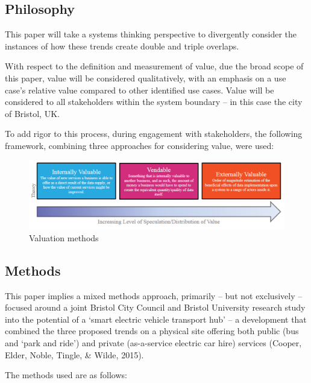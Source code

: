 \documentclass[journal]{IEEEtran}
\begin{document}
\subsection{Philosophy}

This paper will take a systems thinking perspective to divergently
consider the instances of how these trends create double and triple
overlaps.

With respect to the definition and measurement of value, due the broad
scope of this paper, value will be considered qualitatively, with an
emphasis on a use case's relative value compared to other identified
use cases. Value will be considered to all stakeholders within the
system boundary – in this case the city of Bristol, UK.
 
To add rigor to this process, during engagement with stakeholders, the
following framework, combining three approaches for considering value,
were used:

\begin{figure}[!h]
\centering
\includegraphics[width=\columnwidth]{images/valuationmethods.png}
\caption{Valuation methods}
\label{fig:valuationmethods}
\end{figure}


\subsection{Methods}

This paper implies a mixed methods approach, primarily – but not
exclusively -- focused around a joint Bristol City Council and Bristol
University research study into the potential of a `smart electric
vehicle transport hub' -- a development that combined the three
proposed trends on a physical site offering both public (bus and `park
and ride') and private (as-a-service electric car hire) services
(Cooper, Elder, Noble, Tingle, \& Wilde, 2015).

The methods used are as follows:
\end{document}

